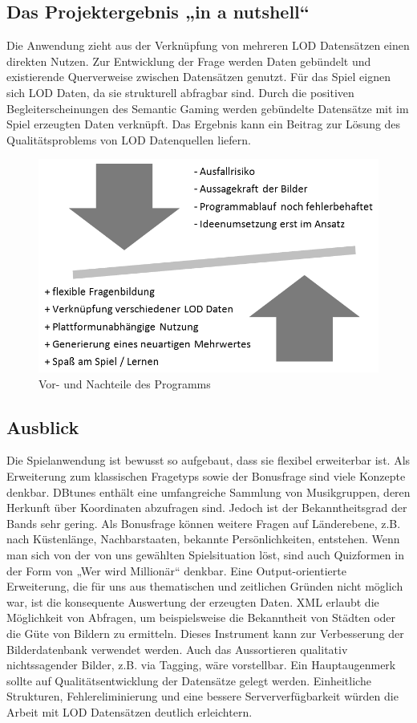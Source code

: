 \documentclass[a4paper, 11pt]{article}
\begin{document}
\subsection{Das Projektergebnis „in a nutshell“}
Die Anwendung zieht aus der Verknüpfung von mehreren LOD Datensätzen einen direkten Nutzen. Zur Entwicklung der Frage werden Daten gebündelt und existierende Querverweise zwischen Datensätzen genutzt. Für das Spiel eignen sich LOD Daten, da sie strukturell abfragbar sind. Durch die positiven Begleiterscheinungen des Semantic Gaming werden gebündelte Datensätze mit im Spiel erzeugten Daten verknüpft. Das Ergebnis kann ein Beitrag zur Lösung des Qualitätsproblems von LOD Datenquellen liefern.
\begin{figure}[H]
	\centering
	\includegraphics[width=0.75\columnwidth, angle=0]{vor_nachteile_sw.png}
	\caption{Vor- und Nachteile des Programms}
	\label{pic:Pakete}
\end{figure}
\enlargethispage{2.0cm}
\subsection{Ausblick}
Die Spielanwendung ist bewusst so aufgebaut, dass sie flexibel erweiterbar ist. Als Erweiterung zum klassischen Fragetyps sowie der Bonusfrage sind viele Konzepte denkbar. DBtunes enthält eine umfangreiche Sammlung von Musikgruppen, deren Herkunft über Koordinaten abzufragen sind. Jedoch ist der Bekanntheitsgrad der Bands sehr gering. Als Bonusfrage können weitere Fragen auf Länderebene, z.B. nach Küstenlänge, Nachbarstaaten, bekannte Persönlichkeiten, entstehen. Wenn man sich von der von uns gewählten Spielsituation löst, sind auch Quizformen in der Form von „Wer wird Millionär“ denkbar. Eine Output-orientierte Erweiterung, die für uns aus thematischen und zeitlichen Gründen nicht möglich war, ist die konsequente Auswertung der erzeugten Daten. XML erlaubt die Möglichkeit von Abfragen, um beispielsweise die Bekanntheit von Städten oder die Güte von Bildern zu ermitteln. Dieses Instrument kann zur Verbesserung der Bilderdatenbank verwendet werden. Auch das Aussortieren qualitativ nichtssagender Bilder, z.B. via Tagging, wäre vorstellbar. Ein Hauptaugenmerk sollte auf Qualitätsentwicklung der Datensätze gelegt werden. Einheitliche Strukturen, Fehlereliminierung und eine bessere Serververfügbarkeit würden die Arbeit mit LOD Datensätzen deutlich erleichtern.
\newpage
\setcounter{page}{2}
\end{document}
